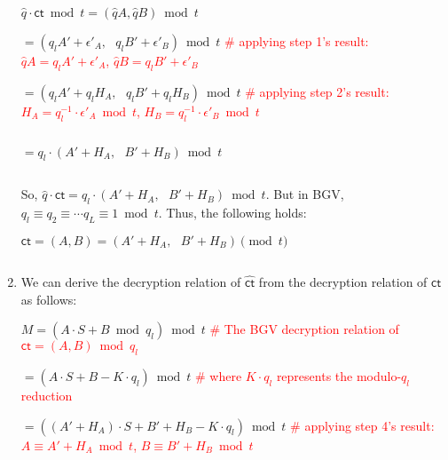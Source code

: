 \begin{enumerate}
$\hat{q}\cdot \textsf{ct} \bmod t = (\hat{q}A, \hat{q}B) \bmod t$

$= (q_{l} A' + \epsilon'_A, \text{ } q_{l} B' + \epsilon'_B) \bmod t$ \textcolor{red}{ \# applying step 1's result: $\hat{q} A = q_{l}A' + \epsilon'_A$, \text{ }  $\hat{q} B = q_{l}B' + \epsilon'_B$}

$ = (q_{l} A' + q_lH_A, \text{ } q_{l} B' + q_lH_B) \bmod t$ 
\textcolor{red}{ \# applying step 2's result: $H_A = q_l^{-1}\cdot\epsilon'_A \bmod t$, \text{ } $H_B = q_l^{-1}\cdot\epsilon'_B \bmod t$}

$ $

$ = q_l\cdot(A' + H_A, \text{ } B' + H_B) \bmod t$


$ $

So, $\hat{q}\cdot\textsf{ct} = q_l\cdot(A' + H_A, \text{ } B' + H_B) \bmod t$. But in BGV, $q_l \equiv q_2 \equiv \cdots q_L \equiv 1 \bmod t$. Thus, the following holds:

$\textsf{ct} = (A, B) = (A' + H_A, \text{ } B' + H_B) \pmod{t}$

\begin{comment}
In other words, $\textsf{ct} = \dfrac{q_l}{\hat{q}}\hat{\textsf{ct}} \pmod{t}$. Let's denote $\kappa = \dfrac{\hat{q}}{q_l} \bmod t$. In BGV, we denote the variable kappa $\kappa$ as a \textit{message correction factor}, which is associated with a BGV ciphertext $\textsf{ct}$ and its inverse $\kappa^{-1}$ is to be multiplied when performing modulo-$t$ reduction at the end of the decryption process. The role of $\kappa$ is to adjust the message coefficients upon decryption to make it decrypt to the expected correct value. For regular BGV ciphertexts, the message correction factor $\kappa = 1$ unless otherwise explicitly stated. 
\end{comment}

$ $

\item We can derive the decryption relation of $\hat{\textsf{ct}}$ from the decryption relation of $\textsf{ct}$ as follows:

$M = (A\cdot S + B \bmod q_l) \bmod t$ \textcolor{red}{ \# The BGV decryption relation of $\textsf{ct} = (A, B) \bmod q_l$}

$= (A\cdot S + B - K\cdot q_l) \bmod t$ \textcolor{red}{ \# where $K\cdot q_l$ represents the modulo-$q_l$ reduction}

$= ((A' + H_A)\cdot S + B' + H_B - K\cdot q_{l}) \bmod t$ \textcolor{red}{ \# applying step 4's result: $A \equiv A' + H_A \bmod t$, \text{ } $B \equiv B' + H_B \bmod t$}


\end{enumerate}
